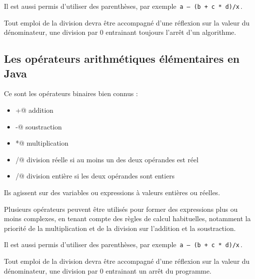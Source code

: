 \documentclass[11pt,a4paper]{article}
\begin{document}
          Il est aussi permis d'utiliser des parenth\`eses, par exemple \,\verb|a – (b + c * d)/x|\,. 
        
            \par
        
          Tout emploi de la division devra \^etre accompagn\'e d'une r\'eflexion sur la
          valeur du d\'enominateur, une division par 0 entrainant toujours l'arr\^et d'un algorithme.
        
            \par
        \subsection{Les op\'erateurs arithm\'etiques \'el\'ementaires en Java}
          Ce sont les op\'erateurs binaires bien connus :
          
					\begin{itemize}
				
			\item \verb@+@ addition
			\item \verb@-@ soustraction
			\item \verb@*@ multiplication
			\item \verb@/@ division r\'eelle si au moins un des deux op\'erandes est r\'eel
			\item \verb@/@ division enti\`ere si les deux op\'erandes sont entiers
					\end{itemize}
				
          Ils agissent sur des variables ou expressions \`a valeurs enti\`eres ou r\'eelles. 
        
            \par
        
          Plusieurs op\'erateurs peuvent \^etre utilis\'es pour former des expressions plus ou moins complexes, 
          en tenant compte des r\`egles de calcul habituelles, notamment la priorit\'e de la multiplication et de la division
          sur l'addition et la soustraction. 
        
            \par
        
          Il est aussi permis d'utiliser des parenth\`eses, par exemple \,\verb|a – (b + c * d)/x|\,. 
        
            \par
        
          Tout emploi de la division devra \^etre accompagn\'e d'une r\'eflexion sur la
          valeur du d\'enominateur, une division par 0 entrainant un arr\^et du programme.
        
\end{document}
